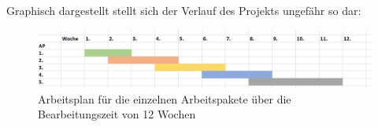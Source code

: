 Graphisch dargestellt stellt sich der Verlauf des Projekts ungefähr so dar:

\begin{figure}[h]
	\begin{center}
		\includegraphics[scale=0.5]{Zeitplan_graphisch.jpg}
		\caption{Arbeitsplan für die einzelnen Arbeitspakete über die Bearbeitungszeit von 12 Wochen}
	\end{center}
\end{figure}


















